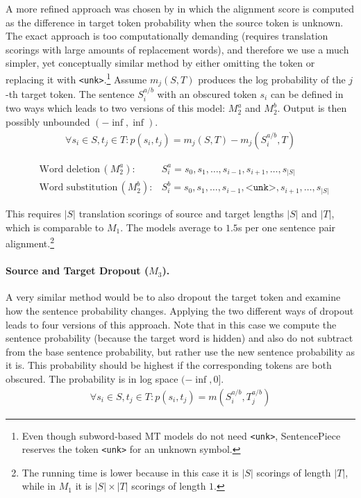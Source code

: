 A more refined approach was chosen by \citet{zintgraf2017visualizing} in which the alignment score is computed as the difference in target token probability when the source token is unknown. The exact approach is too computationally demanding (requires translation scorings with large amounts of replacement words), and therefore we use a much simpler, yet conceptually similar method by either omitting the token or replacing it with \texttt{<unk>}.\footnote{Even though subword-based MT models do not need \texttt{<unk>}, SentencePiece reserves the token \texttt{<unk>} for an unknown symbol.}
Assume $m_j(S, T)$ produces the log probability of the $j$-th target token. The sentence $S^{a/b}_i$ with an obscured token $s_i$ can be defined in two ways which leads to two versions of this model: $M_2^a$ and $M_2^b$. Output is then possibly unbounded $(-\inf,\inf)$.
\begin{gather*}
    \forall s_i \in S, t_j \in T: p(s_i, t_j) = m_j(S, T) - m_j(S^{a/b}_i, T)
\end{gather*}

\vspace{-0.8cm}

\begin{align*}
    & \text{Word deletion}\, (M_2^a): 
    & S^{a}_i = s_0, s_1, \ldots, s_{i-1}, s_{i+1}, \ldots, s_{|S|} \\
    & \text{Word substitution}\, (M_2^b):
    & S^{b}_i = s_0, s_1, \ldots, s_{i-1}, \texttt{<unk>}, s_{i+1}, \ldots, s_{|S|}
\end{align*}

This requires $|S|$ translation scorings of source and target lengths $|S|$ and $|T|$, which is comparable to $M_1$. The models average to $1.5$s per one sentence pair alignment.\footnote{ The running time is lower because in this case it is $|S|$ scorings of length $|T|$, while in $M_1$ it is $|S|\times|T|$ scorings of length $1$.}

\paragraph{Source and Target Dropout ($M_3$).}

A very similar method would be to also dropout the target token and examine how the sentence probability changes. Applying the two different ways of dropout leads to four versions of this approach. Note that in this case we compute the sentence probability (because the target word is hidden) and also do not subtract from the base sentence probability, but rather use the new sentence probability as it is. This probability should be highest if the corresponding tokens are both obscured. The probability is in log space $(-\inf, 0]$.
\vspace{0.2cm}
\begin{gather*}
    \forall s_i \in S, t_j \in T: p(s_i, t_j) = m(S^{a/b}_i , T^{a/b}_j)
\end{gather*}

